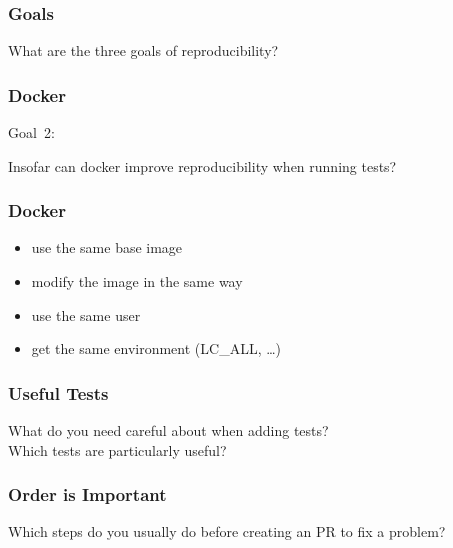 \begin{frame}
	\frametitle{Goals}

	\begin{task}
	What are the three goals of reproducibility?
	\end{task}
\end{frame}


\begin{frame}
	\frametitle{Docker}

	Goal~2:
	\begin{task}
	Insofar can docker improve reproducibility when running tests?
	\end{task}
\end{frame}

\begin{frame}
	\frametitle{Docker}

	\begin{itemize} %
	\item use the same base image
	\item modify the image in the same way
	\item use the same user
	\item get the same environment (LC\_ALL, \dots)
	\end{itemize}
\end{frame}

\breakframe

%
%

\begin{frame}
	\frametitle{Useful Tests}

	\begin{task}
	What do you need careful about when adding tests? \\
	Which tests are particularly useful?
	\end{task}
\end{frame}


\begin{frame}
	\frametitle{Order is Important}

	\begin{task}
	Which steps do you usually do before creating an PR to fix a problem?
	\end{task}
\end{frame}


